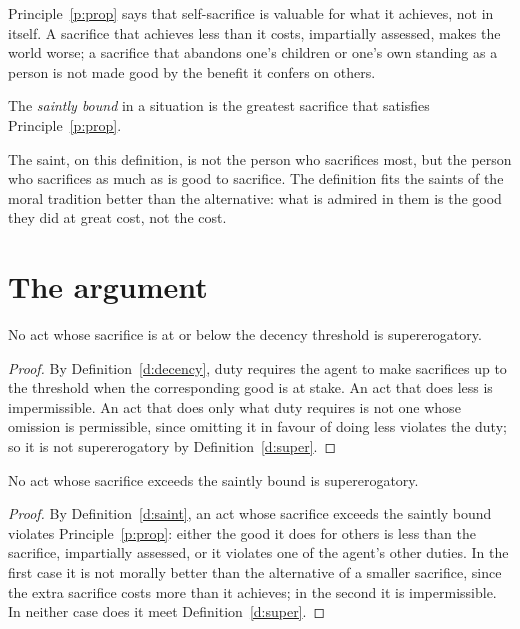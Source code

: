 \documentclass{situationist-preprint}
\begin{document}
Principle~\ref{p:prop} says that self-sacrifice is valuable for what it achieves, not in itself. A sacrifice that achieves less than it costs, impartially assessed, makes the world worse; a sacrifice that abandons one's children or one's own standing as a person is not made good by the benefit it confers on others.

\begin{definition}[Sainthood]\label{d:saint}
The \emph{saintly bound} in a situation is the greatest sacrifice that satisfies Principle~\ref{p:prop}.
\end{definition}

The saint, on this definition, is not the person who sacrifices most, but the person who sacrifices as much as is good to sacrifice. The definition fits the saints of the moral tradition better than the alternative: what is admired in them is the good they did at great cost, not the cost.

\section{The argument}

\begin{lemma}\label{l:lower}
No act whose sacrifice is at or below the decency threshold is supererogatory.
\end{lemma}

\begin{proof}
By Definition~\ref{d:decency}, duty requires the agent to make sacrifices up to the threshold when the corresponding good is at stake. An act that does less is impermissible. An act that does only what duty requires is not one whose omission is permissible, since omitting it in favour of doing less violates the duty; so it is not supererogatory by Definition~\ref{d:super}.
\end{proof}

\begin{lemma}\label{l:upper}
No act whose sacrifice exceeds the saintly bound is supererogatory.
\end{lemma}

\begin{proof}
By Definition~\ref{d:saint}, an act whose sacrifice exceeds the saintly bound violates Principle~\ref{p:prop}: either the good it does for others is less than the sacrifice, impartially assessed, or it violates one of the agent's other duties. In the first case it is not morally better than the alternative of a smaller sacrifice, since the extra sacrifice costs more than it achieves; in the second it is impermissible. In neither case does it meet Definition~\ref{d:super}.
\end{proof}
\end{document}

